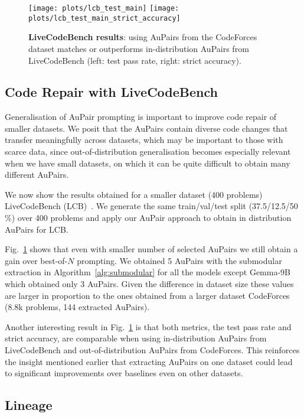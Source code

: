 \documentclass[11pt, a4paper, logo, copyright]{googledeepmind}
\def\aupair/{\textcolor{golden}{Au}Pair}
\def\aupairs/{\textcolor{golden}{Au}Pairs}
\begin{document}
\begin{figure}
    \centering
    \texttt{[image: plots/lcb\_test\_main]}
    \texttt{[image: plots/lcb\_test\_main\_strict\_accuracy]}
    \caption{\textbf{LiveCodeBench results}: using \aupairs/ from the CodeForces dataset matches or outperforms in-distribution \aupairs/ from LiveCodeBench (left: test pass rate, right: strict accuracy).}
    \label{fig:lcb}
\end{figure}

\subsection{Code Repair with LiveCodeBench}\label{sec:LCB}

Generalisation of \aupair/ prompting is important to improve code repair of smaller datasets. We posit that the \aupairs/ contain diverse code changes that transfer meaningfully across datasets, which may be important to those with scarce data, since out-of-distribution generalisation becomes especially relevant when we have small datasets, on which it can be quite difficult to obtain many different \aupairs/.

We now show the results obtained for a smaller dataset (400 problems) LiveCodeBench (LCB)~\citep{jain2024livecodebench}. We generate the same train/val/test split (37.5/12.5/50$\%$) over 400 problems and apply our \aupair/ approach to obtain in distribution \aupairs/ for LCB. 

Fig.~\ref{fig:lcb} shows that even with smaller number of selected \aupairs/ we still obtain a gain over best-of-$N$ prompting. We obtained 5 \aupairs/ with the submodular extraction in Algorithm~\ref{alg:submodular} for all the models except Gemma-9B which obtained only 3 \aupairs/. Given the difference in dataset size these values are larger in proportion to the ones obtained from a larger dataset CodeForces (8.8k problems, 144 extracted \aupairs/).

Another interesting result in Fig.~\ref{fig:lcb} is that both metrics, the test pass rate and strict accuracy, are comparable when using in-distribution \aupairs/ from LiveCodeBench and out-of-distribution \aupairs/ from CodeForces. This reinforces the insight mentioned earlier that extracting \aupairs/ on one dataset could lead to significant improvements over baselines even on other datasets.

\subsection{Lineage}
\end{document}
